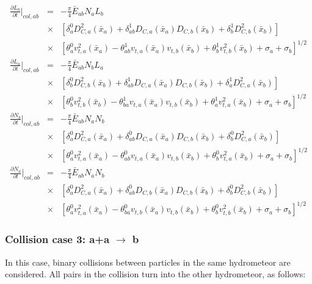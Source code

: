 \begin{eqnarray}
\frac{\partial L_{b}}{\partial t}\Bigr|_{col,ab}&=&-\frac{\pi}{4}\bar{E}_{ab}{N_{a}}{L_{b}}\nonumber\\
&\times&[\delta_{a}^{0}D_{C,a}^{2}(\bar{x}_{a})+\delta_{ab}^{1}D_{C,a}(\bar{x}_{a})D_{C,b}(\bar{x}_{b})+\delta_{b}^{1}D_{C,b}^{2}(\bar{x}_{b})]\label{sn195}\\
&\times&[\theta_{a}^{0}v_{t,a}^{2}(\bar{x}_{a})-\theta_{ab}^{1}v_{t,a}(\bar{x}_{a})v_{t,b}(\bar{x}_{b})+\theta_{b}^{1}v_{t,b}^{2}(\bar{x}_{b})+\sigma_{a}+\sigma_{b}]^{1/2}\nonumber\\
\frac{\partial L_{a}}{\partial t}\Bigr|_{col,ab}&=&-\frac{\pi}{4}\bar{E}_{ab}{N_{b}}{L_{a}}\nonumber\\
&\times&[\delta_{b}^{0}D_{C,b}^{2}(\bar{x}_{b})+\delta_{ab}^{1}D_{C,a}(\bar{x}_{a})D_{C,b}(\bar{x}_{b})+\delta_{a}^{1}D_{C,a}^{2}(\bar{x}_{b})]\label{sn196}\\
&\times&[\theta_{b}^{0}v_{t,b}^{2}(\bar{x}_{b})-\theta_{ba}^{1}v_{t,a}(\bar{x}_{a})v_{t,b}(\bar{x}_{b})+\theta_{a}^{1}v_{t,a}^{2}(\bar{x}_{b})+\sigma_{a}+\sigma_{b}]^{1/2}\nonumber\\
\frac{\partial N_{b}}{\partial t}\Bigr|_{col,ab}&=&-\frac{\pi}{4}\bar{E}_{ab}{N_{a}}{N_{b}}\nonumber\\
&\times&[\delta_{a}^{0}D_{C,a}^{2}(\bar{x}_{a})+\delta_{ab}^{0}D_{C,a}(\bar{x}_{a})D_{C,b}(\bar{x}_{b})+\delta_{b}^{0}D_{C,a}^{2}(\bar{x}_{b})]\label{sn197}\\
&\times&[\theta_{a}^{0}v_{t,a}^{2}(\bar{x}_{a})-\theta_{ab}^{0}v_{t,a}(\bar{x}_{a})v_{t,b}(\bar{x}_{b})+\theta_{b}^{0}v_{t,a}^{2}(\bar{x}_{b})+\sigma_{a}+\sigma_{b}]^{1/2}\nonumber\\
\frac{\partial N_{a}}{\partial t}\Bigr|_{col,ab}&=&-\frac{\pi}{4}\bar{E}_{ab}{N_{a}}{N_{b}}\nonumber\\
&\times&[\delta_{a}^{0}D_{C,a}^{2}(\bar{x}_{a})+\delta_{ab}^{0}D_{C,b}(\bar{x}_{a})D_{C,b}(\bar{x}_{b})+\delta_{b}^{0}D_{C,b}^{2}(\bar{x}_{b})]\label{sn198}\\
&\times&[\theta_{a}^{0}v_{t,a}^{2}(\bar{x}_{a})-\theta_{ba}^{0}v_{t,b}(\bar{x}_{a})v_{t,b}(\bar{x}_{b})+\theta_{b}^{0}v_{t,b}^{2}(\bar{x}_{b})+\sigma_{a}+\sigma_{b}]^{1/2}\nonumber
\end{eqnarray}

\subsubsection{Collision case 3: a+a $\rightarrow$ b}
In this case, binary collisions between particles in the same hydrometeor are considered. All pairs in the collision turn into the other hydrometeor, as follows:

